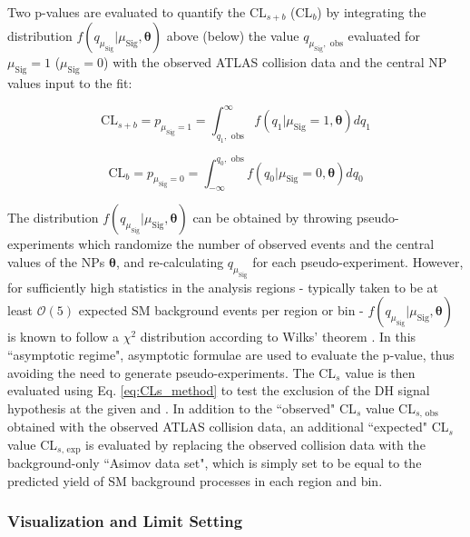 Two p-values are evaluated to quantify the CL\(_{s+b}\) (CL\(_b\)) by integrating the distribution \(f(q_{\mu_\text{Sig}}|\mu_\text{Sig}, \boldsymbol{\theta})\) above (below) the value \(q_{\mu_\text{Sig},\text{ obs}}\) evaluated for \(\mu_\text{Sig}=1\) (\(\mu_\text{Sig}=0\)) with the observed ATLAS collision data and the central NP values input to the fit:

\begin{equation}
\label{eq:pvalue_CLs_b}
\text{CL}_{s+b} = p_{\mu_\text{Sig}=1} = \int_{q_{1},\text{ obs}}^\infty f(q_{1}|\mu_\text{Sig}=1, \boldsymbol{\theta})dq_{1}
\end{equation}

\begin{equation}
\label{eq:pvalue_CLb}
\text{CL}_{b} = p_{\mu_\text{Sig}=0} = \int_{-\infty}^{q_0,\text{ obs}} f(q_{0}|\mu_\text{Sig}=0, \boldsymbol{\theta})dq_{0}
\end{equation}

The distribution \(f(q_{\mu_\text{Sig}}|\mu_\text{Sig}, \boldsymbol{\theta})\) can be obtained by throwing pseudo-experiments which randomize the number of observed events and the central values of the NPs \(\boldsymbol{\theta}\), and re-calculating \(q_{\mu_\text{Sig}}\) for each pseudo-experiment. However, for sufficiently high statistics in the analysis regions - typically taken to be at least \(\mathcal{O}(5)\) expected SM background events per region or bin - \(f(q_{\mu_\text{Sig}}|\mu_\text{Sig}, \boldsymbol{\theta})\) is known to follow a \(\chi^2\) distribution according to Wilks' theorem \cite{Wilks_1938}. In this ``asymptotic regime", asymptotic formulae \cite{Cowan_2011} are used to evaluate the p-value, thus avoiding the need to generate pseudo-experiments. The CL\(_s\) value is then evaluated using Eq. \ref{eq:CLs_method}  to test the exclusion of the DH signal hypothesis at the given \ms and \mZp. In addition to the ``observed" CL\(_s\) value CL\(_{s\text{, obs}}\) obtained with the observed ATLAS collision data, an additional ``expected" CL\(_s\) value CL\(_{s\text{, exp}}\) is evaluated by replacing the observed collision data with the background-only ``Asimov data set", which is simply set to be equal to the predicted yield of SM background processes in each region and bin.

\subsubsection{Visualization and Limit Setting}

